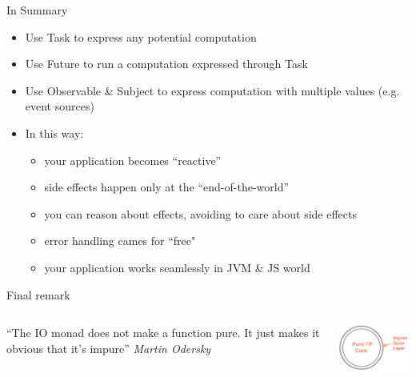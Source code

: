 \documentclass[presentation, 9pt]{beamer}\mode<presentation>{\usetheme{AMSBolognaFC}}
\begin{document}
\begin{frame}[fragile]{In Summary}
	\begin{itemize}
		\item Use Task to express any potential computation
  	\item Use Future to run a computation expressed through Task 
   	\item Use Observable \& Subject to express computation with multiple values (e.g. event sources)
    \item In this way:
    \begin{itemize}
			\item your application becomes ``reactive''
   		\item side effects happen only at the ``end-of-the-world''
     \item you can reason about effects, avoiding to care about side effects
     \item error handling cames for ``free"
     \item your application works seamlessly in JVM \& JS world
		\end{itemize}
	\end{itemize}
	\begin{alertblock}{Final remark}
		\begin{columns}
			\begin{column}[c]{0.4\textwidth}
				``The IO monad does not make a function pure. It just makes it obvious that it's impure''
				\emph{Martin Odersky}
			\end{column}
			\begin{column}[c]{0.4\textwidth}

	\includegraphics[width=4cm]{img/pure-impure.png}
			\end{column}
		\end{columns}
	\end{alertblock}
\end{frame}
\end{document}
